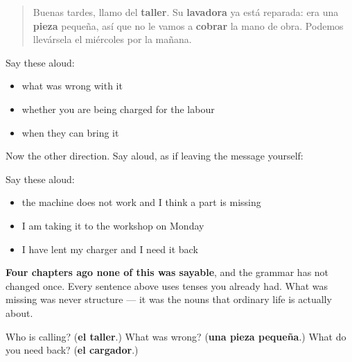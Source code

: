 \begin{quote}
Buenas tardes, llamo del \textbf{taller}. Su \textbf{lavadora} ya está reparada: era una \textbf{pieza} pequeña, así que no le vamos a \textbf{cobrar} la mano de obra. Podemos llevársela el miércoles por la mañana.
\end{quote}

Say these aloud:

\begin{itemize}
\raggedright
  \item what was wrong with it
  \item whether you are being charged for the labour
  \item when they can bring it
\end{itemize}

\begin{grammarlens}[title={What you've built}]
Now the other direction. Say aloud, as if leaving the message yourself:

Say these aloud:

\begin{itemize}
\raggedright
  \item the machine does not work and I think a part is missing
  \item I am taking it to the workshop on Monday
  \item I have lent my charger and I need it back
\end{itemize}

\textbf{Four chapters ago none of this was sayable}, and the grammar has not changed once. Every sentence above uses tenses you already had. What was missing was never structure — it was the nouns that ordinary life is actually about.
\end{grammarlens}

\begin{tcolorbox}[breakable,colback=teal!4,colframe=teal!35!black,title={Before you move on}]
Who is calling? (\textbf{el taller}.) What was wrong? (\textbf{una pieza pequeña}.) What do you need back? (\textbf{el cargador}.)
\end{tcolorbox}
